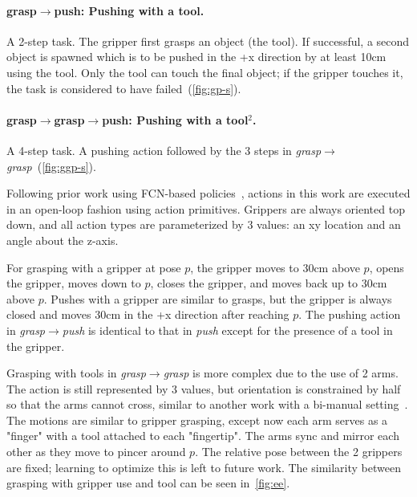 \documentclass[10pt,twocolumn,letterpaper]{article}
\begin{document}
\vspace{-10pt}

\paragraph{grasp$\rightarrow$push: Pushing with a tool.} A 2-step task. The gripper first grasps an object (the tool). If successful, a second object is spawned which is to be pushed in the +x direction by at least 10cm using the tool. Only the tool can touch the final object; if the gripper touches it, the task is considered to have failed~(\cref{fig:gp-s}).

\vspace{-10pt}

\paragraph{grasp$\rightarrow$grasp$\rightarrow$push: Pushing with a tool$^2$.} A 4-step task. A pushing action followed by the 3 steps in \emph{grasp$\rightarrow$grasp}~(\cref{fig:ggp-s}). \newline


Following prior work using FCN-based policies~\cite{zeng2020transporter}, actions in this work are executed in an open-loop fashion using action primitives. Grippers are always oriented top down, and all action types are parameterized by 3 values: an xy location and an angle about the z-axis.

For grasping with a gripper at pose $p$, the gripper moves to 30cm above $p$, opens the gripper, moves down to $p$, closes the gripper, and moves back up to 30cm above $p$. Pushes with a gripper are similar to grasps, but the gripper is always closed and moves 30cm in the +x direction after reaching $p$. The pushing action in \emph{grasp$\rightarrow$push} is identical to that in \emph{push} except for the presence of a tool in the gripper.

Grasping with tools in \emph{grasp$\rightarrow$grasp} is more complex due to the use of 2 arms. The action is still represented by 3 values, but orientation is constrained by half so that the arms cannot cross, similar to another work with a bi-manual setting~\cite{ha2021flingbot}. The motions are similar to gripper grasping, except now each arm serves as a "finger" with a tool attached to each "fingertip". The arms sync and mirror each other as they move to pincer around $p$. The relative pose between the 2 grippers are fixed; learning to optimize this is left to future work. The similarity between grasping with gripper use and tool can be seen in~\cref{fig:ee}.
\end{document}

